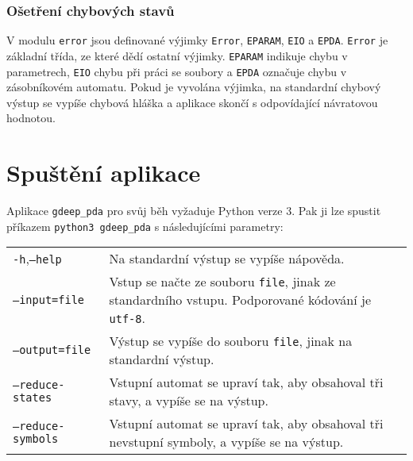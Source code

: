 \subsubsection{Ošetření chybových stavů}

V modulu \texttt{error} jsou definované výjimky \texttt{Error}, \texttt{EPARAM}, \texttt{EIO} a \texttt{EPDA}. \texttt{Error} je základní třída, ze které dědí ostatní výjimky. \texttt{EPARAM} indikuje chybu v parametrech, \texttt{EIO} chybu při práci se soubory a \texttt{EPDA} označuje chybu v zásobníkovém automatu. Pokud je vyvolána výjimka, na standardní chybový výstup se vypíše chybová hláška a aplikace skončí s odpovídající návratovou hodnotou.



\section{Spuštění aplikace}

Aplikace \texttt{gdeep\_pda} pro svůj běh vyžaduje Python verze 3. Pak ji lze spustit příkazem \texttt{python3 gdeep\_pda} s následujícími parametry:

\begin{tabular}{l p{10cm}}\\
\texttt{-h},\texttt{--help} 	& Na standardní výstup se vypíše nápověda. \\
\texttt{--input=file}   	& Vstup se načte ze souboru \texttt{file}, jinak ze standardního vstupu. Podporované kódování je \texttt{utf-8}.\\
\texttt{--output=file}  	& Výstup se vypíše do souboru \texttt{file}, jinak na standardní výstup.	\\
\texttt{--reduce-states} 	& Vstupní automat se upraví tak, aby obsahoval tři stavy, a vypíše se na výstup. \\
\texttt{--reduce-symbols} 	& Vstupní automat se upraví tak, aby obsahoval tři nevstupní symboly, a vypíše se na výstup.
\end{tabular}










